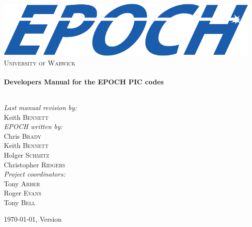 \begin{titlepage}

\begin{center}

\includegraphics[width=14cm]{./images/EPOCHLogo}\\[1cm]

\textsc{\LARGE{University of Warwick}}\\[1.5cm]

\HRule\\[0.2cm]%
{\huge\bfseries{Developers Manual for the EPOCH PIC codes}}\\[0.4cm]
\HRule\\[1.5cm]

\begin{minipage}{0.7\textwidth}
\begin{flushleft}\large%
\emph{Last manual revision by:}\\
Keith \textsc{Bennett}\\
\vspace{1cm}
\emph{EPOCH written by:} \\
Chris \textsc{Brady}\\
Keith \textsc{Bennett}\\
Holger \textsc{Schmitz}\\
Christopher \textsc{Ridgers}\\
\vspace{1cm}
\emph{Project coordinators:} \\
Tony \textsc{Arber}\\
Roger \textsc{Evans}\\
Tony \textsc{Bell}\\
\end{flushleft}
\end{minipage}

\vfill%
{\large\today, {\EPOCH} Version \version}

\end{center}

\end{titlepage}
